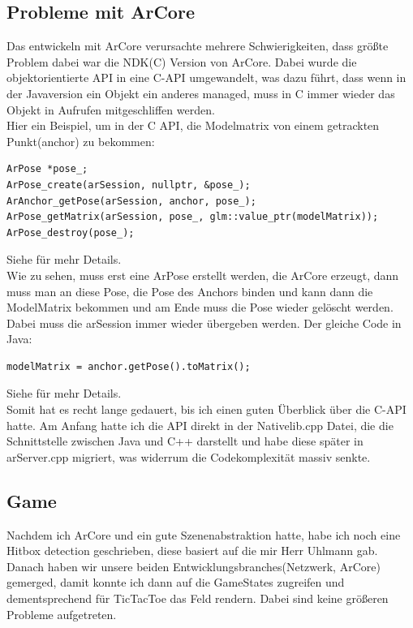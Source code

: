 \subsection{Probleme mit ArCore}
Das entwickeln mit ArCore verursachte mehrere Schwierigkeiten, dass größte Problem dabei war
die NDK(C) Version von ArCore. Dabei wurde die objektorientierte API in eine C-API
umgewandelt, was dazu führt, dass wenn in der Javaversion  ein Objekt ein anderes managed,
muss in C immer wieder das Objekt in Aufrufen mitgeschliffen werden.
\\
Hier ein Beispiel, um in der C API, die Modelmatrix von einem getrackten Punkt(anchor) zu bekommen:
\begin{verbatim}
ArPose *pose_;
ArPose_create(arSession, nullptr, &pose_);
ArAnchor_getPose(arSession, anchor, pose_);
ArPose_getMatrix(arSession, pose_, glm::value_ptr(modelMatrix));
ArPose_destroy(pose_);
\end{verbatim}
Siehe \cite{ar_anchor_c} für mehr Details.\\
Wie zu sehen, muss erst eine ArPose erstellt werden, die ArCore erzeugt, dann muss man an diese Pose, die Pose des Anchors binden und kann dann die ModelMatrix bekommen und am Ende muss die Pose wieder gelöscht werden. Dabei muss die arSession immer wieder übergeben werden.
Der gleiche Code in Java:
\begin{verbatim}
modelMatrix = anchor.getPose().toMatrix();
\end{verbatim}
Siehe \cite{ar_anchor_java} für mehr Details.\\
Somit hat es recht lange gedauert, bis ich einen guten Überblick über die C-API
hatte. Am Anfang hatte ich die API direkt in der Nativelib.cpp Datei, die die
Schnittstelle zwischen Java und C++ darstellt und habe diese später in arServer.cpp
migriert, was widerrum die Codekomplexität massiv senkte.

\subsection{Game}
Nachdem ich ArCore und ein gute Szenenabstraktion hatte, habe ich noch eine Hitbox detection geschrieben, diese basiert auf \cite{hitbox_detection}
die mir Herr Uhlmann gab.\\

Danach haben wir unsere beiden Entwicklungsbranches(Netzwerk, ArCore) gemerged, damit konnte ich
dann auf die GameStates zugreifen und dementsprechend für TicTacToe das Feld rendern.
Dabei sind keine größeren Probleme aufgetreten. \\

